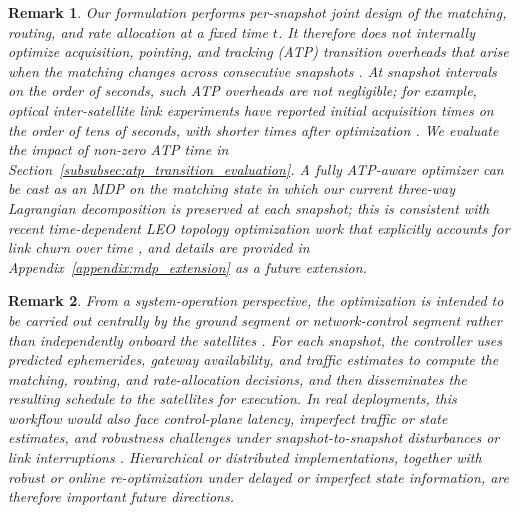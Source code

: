 \documentclass[journal]{IEEEtran}
\newtheorem{rem}{Remark}
\begin{document}
\begin{rem}
Our formulation performs per-snapshot joint design of the matching, routing, and rate allocation at a fixed time $t$. It therefore does not internally optimize acquisition, pointing, and tracking (ATP) transition overheads that arise when the matching changes across consecutive snapshots \cite{kaymak2018survey,li2011analytical,scheinfeild2000acquisition}. At snapshot intervals on the order of seconds, such ATP overheads are not negligible; for example, optical inter-satellite link experiments have reported initial acquisition times on the order of tens of seconds, with shorter times after optimization \cite{smutny2009gbps}. We evaluate the impact of non-zero ATP time in Section~\ref{subsubsec:atp_transition_evaluation}. A fully ATP-aware optimizer can be cast as an MDP on the matching state in which our current three-way Lagrangian decomposition is preserved at each snapshot; this is consistent with recent time-dependent LEO topology optimization work that explicitly accounts for link churn over time \cite{ron2025time}, and details are provided in Appendix~\ref{appendix:mdp_extension} as a future extension.
\end{rem}


\begin{rem}
From a system-operation perspective, the optimization is intended to be carried out centrally by the ground segment or network-control segment rather than independently onboard the satellites \cite{3gpp38821,guidotti2024role}. For each snapshot, the controller uses predicted ephemerides, gateway availability, and traffic estimates to compute the matching, routing, and rate-allocation decisions, and then disseminates the resulting schedule to the satellites for execution. In real deployments, this workflow would also face control-plane latency, imperfect traffic or state estimates, and robustness challenges under snapshot-to-snapshot disturbances or link interruptions \cite{guidotti2024role,wu2025enhancing}. Hierarchical or distributed implementations, together with robust or online re-optimization under delayed or imperfect state information, are therefore important future directions.
\end{rem}


\end{document}
